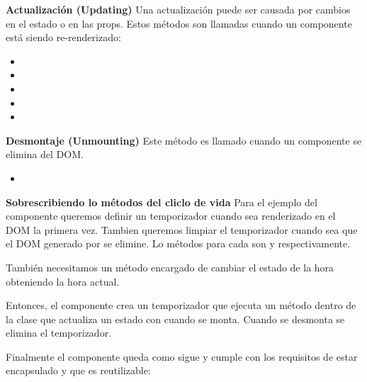 \textbf{Actualización (Updating)}
\label{\detokenize{reactjs:actualizacion-updating}}
Una actualización puede ser causada por cambios en el estado o en las props.
Estos métodos son llamadas cuando un componente está siendo re-renderizado:
\begin{itemize}
\item {} 

\item {} 

\item {} 

\item {} 

\item {} 

\end{itemize}


\textbf{Desmontaje (Unmounting)}
\label{\detokenize{reactjs:desmontaje-unmounting}}
Este método es llamado cuando un componente se elimina del DOM.
\begin{itemize}
\item {} 

\end{itemize}


\textbf{Sobrescribiendo lo métodos del cliclo de vida}
\label{\detokenize{reactjs:sobrescribiendo-lo-metodos-del-cliclo-de-vida}}
Para el ejemplo del componente  queremos definir un temporizador cuando
sea renderizado en el DOM la primera vez. Tambien queremos limpiar el
temporizador cuando sea que el DOM generado por  se elimine. Lo métodos
para cada son  y 
respectivamente.

También necesitamos un método encargado de cambiar el estado de la hora obteniendo
la hora actual.

Entonces, el componente crea un temporizador que ejecuta un método
dentro de la clase que actualiza un estado con  cuando se monta.
Cuando se desmonta se elimina el temporizador.

Finalmente el componente queda como sigue y cumple con los requisitos de
estar encapsulado y que es reutilizable:

